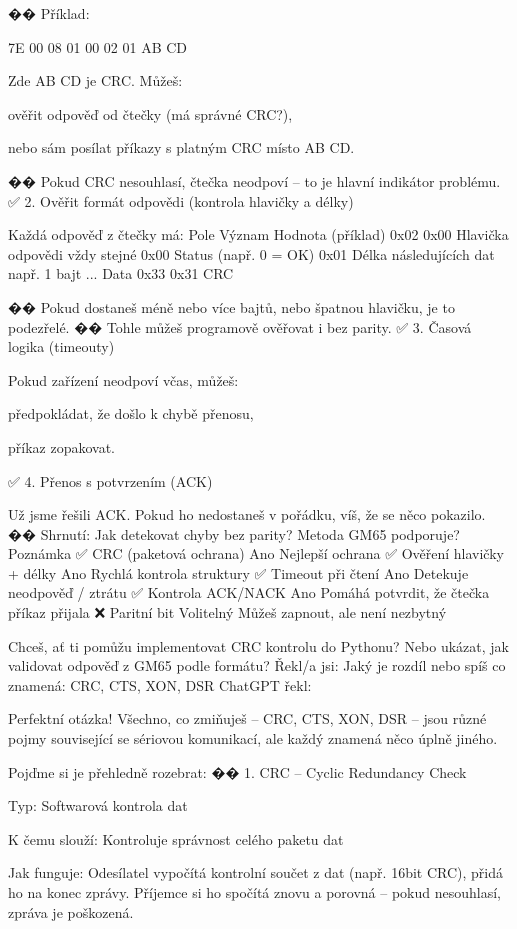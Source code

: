 �� Příklad:

7E 00 08 01 00 02 01 AB CD

Zde AB CD je CRC. Můžeš:

    ověřit odpověď od čtečky (má správné CRC?),

    nebo sám posílat příkazy s platným CRC místo AB CD.

�� Pokud CRC nesouhlasí, čtečka neodpoví – to je hlavní indikátor problému.
✅ 2. Ověřit formát odpovědi (kontrola hlavičky a délky)

Každá odpověď z čtečky má:
Pole	Význam	Hodnota (příklad)
0x02 0x00	Hlavička odpovědi	vždy stejné
0x00	Status (např. 0 = OK)	
0x01	Délka následujících dat	např. 1 bajt
...	Data	
0x33 0x31	CRC	

�� Pokud dostaneš méně nebo více bajtů, nebo špatnou hlavičku, je to podezřelé.
�� Tohle můžeš programově ověřovat i bez parity.
✅ 3. Časová logika (timeouty)

Pokud zařízení neodpoví včas, můžeš:

    předpokládat, že došlo k chybě přenosu,

    příkaz zopakovat.

✅ 4. Přenos s potvrzením (ACK)

Už jsme řešili ACK. Pokud ho nedostaneš v pořádku, víš, že se něco pokazilo.
�� Shrnutí: Jak detekovat chyby bez parity?
Metoda	GM65 podporuje?	Poznámka
✅ CRC (paketová ochrana)	Ano	Nejlepší ochrana
✅ Ověření hlavičky + délky	Ano	Rychlá kontrola struktury
✅ Timeout při čtení	Ano	Detekuje neodpověď / ztrátu
✅ Kontrola ACK/NACK	Ano	Pomáhá potvrdit, že čtečka příkaz přijala
❌ Paritní bit	Volitelný	Můžeš zapnout, ale není nezbytný

Chceš, ať ti pomůžu implementovat CRC kontrolu do Pythonu? Nebo ukázat, jak validovat odpověď z GM65 podle formátu?
Řekl/a jsi:
Jaký je rozdíl nebo spíš co znamená: CRC, CTS, XON, DSR
ChatGPT řekl:

Perfektní otázka! Všechno, co zmiňuješ – CRC, CTS, XON, DSR – jsou různé pojmy související se sériovou komunikací, ale každý znamená něco úplně jiného.

Pojďme si je přehledně rozebrat:
�� 1. CRC – Cyclic Redundancy Check

    Typ: Softwarová kontrola dat

    K čemu slouží: Kontroluje správnost celého paketu dat

    Jak funguje: Odesílatel vypočítá kontrolní součet z dat (např. 16bit CRC), přidá ho na konec zprávy. Příjemce si ho spočítá znovu a porovná – pokud nesouhlasí, zpráva je poškozená.

